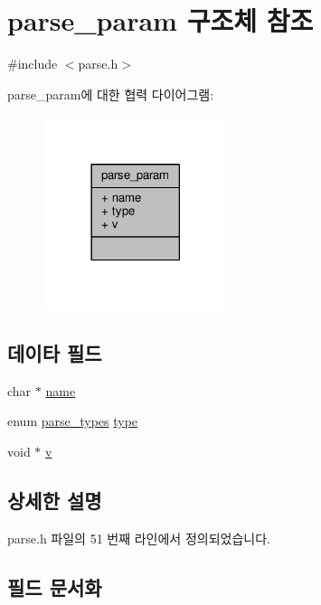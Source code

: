 \hypertarget{structparse__param}{}\section{parse\+\_\+param 구조체 참조}
\label{structparse__param}


{\ttfamily \#include $<$parse.\+h$>$}



parse\+\_\+param에 대한 협력 다이어그램\+:
\nopagebreak
\begin{figure}[H]
\begin{center}
\leavevmode
\includegraphics[width=153pt]{structparse__param__coll__graph}
\end{center}
\end{figure}
\subsection*{데이타 필드}
\begin{DoxyCompactItemize}
\item 
char $\ast$ \hyperlink{structparse__param_a5ac083a645d964373f022d03df4849c8}{name}
\item 
enum \hyperlink{parse_8h_a93f84b99386e130a55f8403e259db5d1}{parse\+\_\+types} \hyperlink{structparse__param_a0a166059b44f584dc5dbec3ef5690c76}{type}
\item 
void $\ast$ \hyperlink{structparse__param_a67806b49e20fb1170422969965db6ecb}{v}
\end{DoxyCompactItemize}


\subsection{상세한 설명}


parse.\+h 파일의 51 번째 라인에서 정의되었습니다.



\subsection{필드 문서화}
